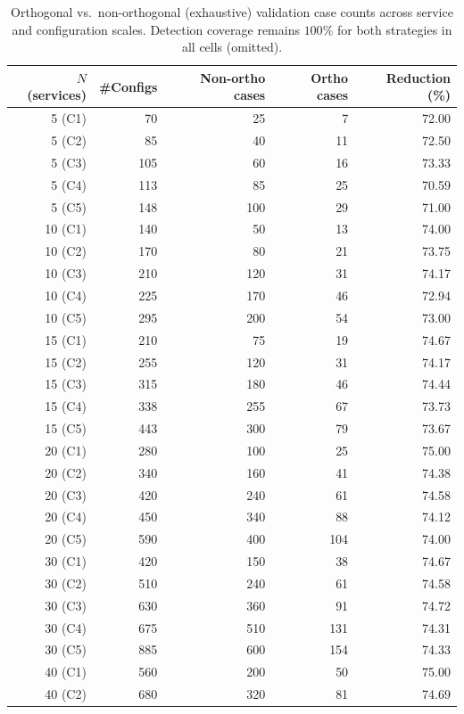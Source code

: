 \begin{table}[t]
\centering
\caption{Orthogonal vs.\ non-orthogonal (exhaustive) validation case counts across service and configuration scales. Detection coverage remains $100\%$ for both strategies in all cells (omitted).}
\label{tab:ortho-vs-nonortho-cases}
\scriptsize
\begin{tabular}{rrrrr}
\toprule
$N$ (services) & \#Configs & Non-ortho cases & Ortho cases & Reduction (\%) \\
\midrule
5 (C1) & 70 & 25 & 7 & 72.00 \\
5 (C2) & 85 & 40 & 11 & 72.50 \\
5 (C3) & 105 & 60 & 16 & 73.33 \\
5 (C4) & 113 & 85 & 25 & 70.59 \\
5 (C5) & 148 & 100 & 29 & 71.00 \\
\midrule
10 (C1) & 140 & 50 & 13 & 74.00 \\
10 (C2) & 170 & 80 & 21 & 73.75 \\
10 (C3) & 210 & 120 & 31 & 74.17 \\
10 (C4) & 225 & 170 & 46 & 72.94 \\
10 (C5) & 295 & 200 & 54 & 73.00 \\
\midrule
15 (C1) & 210 & 75 & 19 & 74.67 \\
15 (C2) & 255 & 120 & 31 & 74.17 \\
15 (C3) & 315 & 180 & 46 & 74.44 \\
15 (C4) & 338 & 255 & 67 & 73.73 \\
15 (C5) & 443 & 300 & 79 & 73.67 \\
\midrule
20 (C1) & 280 & 100 & 25 & 75.00 \\
20 (C2) & 340 & 160 & 41 & 74.38 \\
20 (C3) & 420 & 240 & 61 & 74.58 \\
20 (C4) & 450 & 340 & 88 & 74.12 \\
20 (C5) & 590 & 400 & 104 & 74.00 \\
\midrule
30 (C1) & 420 & 150 & 38 & 74.67 \\
30 (C2) & 510 & 240 & 61 & 74.58 \\
30 (C3) & 630 & 360 & 91 & 74.72 \\
30 (C4) & 675 & 510 & 131 & 74.31 \\
30 (C5) & 885 & 600 & 154 & 74.33 \\
\midrule
40 (C1) & 560 & 200 & 50 & 75.00 \\
40 (C2) & 680 & 320 & 81 & 74.69 \\

\end{tabular}
\end{table}
